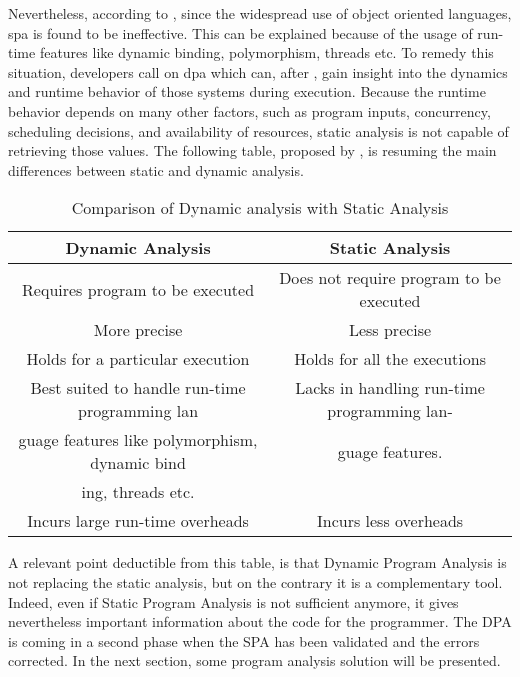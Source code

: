 Nevertheless, according to \cite{Gosain2015}, since the widespread use of object oriented languages, \gls{spa} is found to be ineffective. This can be explained because of the usage of run-time features like dynamic binding, polymorphism, threads etc. To remedy this situation, developers call on \gls{dpa} which can, after \cite{Marek2015100}, gain insight into the dynamics and runtime behavior of those systems during execution. Because the runtime behavior depends on many other factors, such as program inputs, concurrency, scheduling decisions, and availability of resources, static analysis is not capable of retrieving those values. The following table, proposed by \cite{Gosain2015}, is resuming the main differences between static and dynamic analysis.

\bigskip

\begin{table}[htb]
\begin{center}
\begin{tabulary}{\textwidth}{CC}
  \hline
  Dynamic Analysis 	& Static Analysis \\\hline
  Requires program to be executed	& Does not require program to be executed \\
  More precise & Less precise \\
  Holds for a particular execution & Holds for all the executions \\
  Best suited to handle run-time programming lan & Lacks in handling run-time programming lan-\\
guage features like polymorphism, dynamic bind & guage features.\\
ing, threads etc. &  \\
  Incurs large run-time overheads & Incurs less overheads \\\hline
\end{tabulary}
\end{center}
\caption{Comparison of Dynamic analysis with Static Analysis}
\label{list:survey}
\end{table}

\bigskip

A relevant point deductible from this table, is that Dynamic Program Analysis is not replacing the static analysis, but on the contrary it is a complementary tool. Indeed, even if Static Program Analysis is not sufficient anymore, it gives nevertheless important information about the code for the programmer. The DPA is coming in a second phase when the SPA has been validated and the errors corrected. In the next section, some program analysis solution will be presented.

